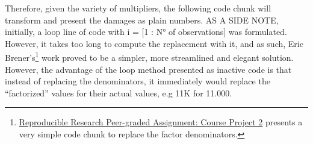 \documentclass[
]{article}
\newenvironment{Shaded}{\begin{snugshade}}{\end{snugshade}}
\newcommand{\AttributeTok}[1]{\textcolor[rgb]{0.77,0.63,0.00}{#1}}
\newcommand{\ConstantTok}[1]{\textcolor[rgb]{0.00,0.00,0.00}{#1}}
\newcommand{\DecValTok}[1]{\textcolor[rgb]{0.00,0.00,0.81}{#1}}
\newcommand{\FunctionTok}[1]{\textcolor[rgb]{0.00,0.00,0.00}{#1}}
\newcommand{\NormalTok}[1]{#1}
\newcommand{\OtherTok}[1]{\textcolor[rgb]{0.56,0.35,0.01}{#1}}
\newcommand{\SpecialCharTok}[1]{\textcolor[rgb]{0.00,0.00,0.00}{#1}}
\newcommand{\StringTok}[1]{\textcolor[rgb]{0.31,0.60,0.02}{#1}}
\begin{document}
Therefore, given the variety of multipliers, the following code chunk
will transform and present the damages as plain numbers. AS A SIDE NOTE,
initially, a loop line of code with i = {[}1 : N° of observations{]} was
formulated. However, it takes too long to compute the replacement with
it, and as such, Eric Brener's\footnote{\href{https://rpubs.com/EricTheBren/RepoResearchProj2}{Reproducible
  Research Peer-graded Assignment: Course Project 2} presents a very
  simple code chunk to replace the factor denominators.} work proved to
be a simpler, more streamlined and elegant solution. However, the
advantage of the loop method presented as inactive code is that instead
of replacing the denominators, it immediately would replace the
``factorized'' values for their actual values, e.g 11K for 11.000.

\begin{Shaded}
\end{Shaded}
\end{document}
